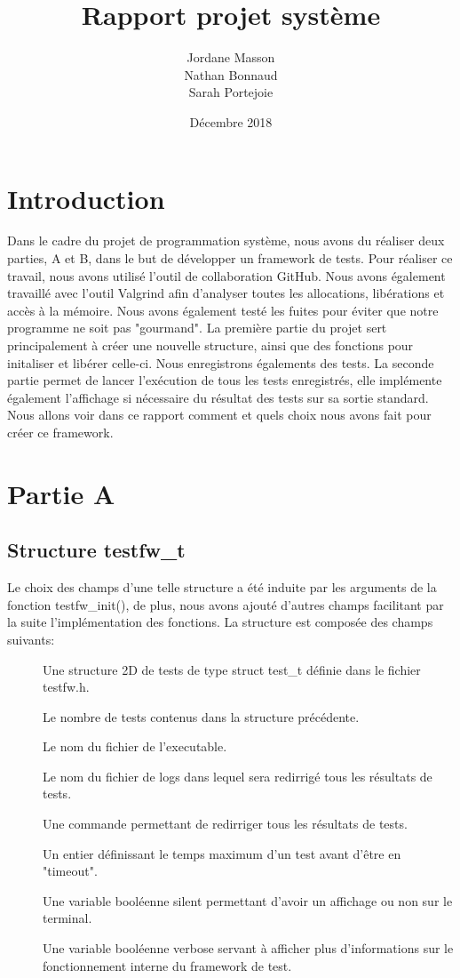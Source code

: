 \documentclass{article}
\title{Rapport projet système}
\author{Jordane Masson \\ Nathan Bonnaud \\ Sarah Portejoie}
\date{Décembre 2018}
\begin{document}
\maketitle

\section{Introduction}
Dans le cadre du projet de programmation système, nous avons du réaliser deux parties, A et B, dans le but de développer un framework de tests. Pour réaliser ce travail, nous avons utilisé l'outil de collaboration GitHub. Nous avons également travaillé avec l'outil Valgrind afin d'analyser toutes les allocations, libérations et accès à la mémoire. Nous avons également testé les fuites pour éviter que notre programme ne soit pas "gourmand".
La première partie du projet sert principalement à créer une nouvelle structure, ainsi que des fonctions pour initaliser et libérer celle-ci. Nous enregistrons égalements des tests. La seconde partie permet de lancer l'exécution de tous les tests enregistrés, elle implémente également l'affichage si nécessaire du résultat des tests sur sa sortie standard.
Nous allons voir dans ce rapport comment et quels choix nous avons fait pour créer ce framework.
    
   
\section{Partie A}   
\subsection{Structure testfw\_t}
Le choix des champs d'une telle structure a été induite par les arguments de la fonction testfw\_init(), de plus, 
 nous avons ajouté d'autres champs facilitant par la suite l'implémentation des fonctions. La structure est composée des champs suivants:
 \begin{description}
 \item[] Une structure 2D de tests de type struct test\_t définie dans le fichier testfw.h. 
 \item[] Le nombre de tests contenus dans la structure précédente.
 \item[] Le nom du fichier de l'executable. 
 \item[] Le nom du fichier de logs dans lequel sera redirrigé tous les résultats de tests.
 \item[] Une commande  permettant de redirriger tous les résultats de tests.
 \item[] Un entier définissant le temps maximum d'un test avant d'être en "timeout".
 \item[] Une variable booléenne silent permettant d'avoir un affichage ou non sur le terminal. 
 \item[] Une variable booléenne verbose servant à afficher plus d'informations sur le fonctionnement interne du framework de test.
\end{description}
\end{document}

